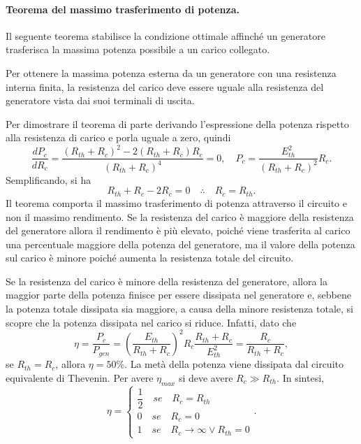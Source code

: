\paragraph{Teorema del massimo trasferimento di potenza.} Il seguente teorema stabilisce la condizione ottimale affinché un generatore trasferisca la massima potenza possibile a un carico collegato.
\begin{teo}
    Per ottenere la massima potenza esterna da un generatore con una resistenza interna finita, la resistenza del carico deve essere uguale alla resistenza del generatore vista dai suoi terminali di uscita.
\end{teo}
Per dimostrare il teorema di parte derivando l'espressione della potenza rispetto alla resistenza di carico e porla uguale a zero, quindi
\begin{equation}
    \frac{dP_c}{dR_c}=\frac{(R_{th}+R_c)^2 -2(R_{th}+R_c)R_c}{(R_{th}+R_c)^4}=0,\quad P_c=\frac{E_{th}^2}{(R_{th}+R_c)^2}R_c.
\end{equation}
Semplificando, si ha 
\begin{equation}
    R_{th}+R_c-2R_c=0\quad\therefore\quad R_c=R_{th}.
\end{equation}
Il teorema comporta il massimo trasferimento di potenza attraverso il circuito e non il massimo rendimento. Se la resistenza del carico è maggiore della resistenza del generatore allora il rendimento è più elevato, poiché viene trasferita al carico una percentuale maggiore della potenza del generatore, ma il valore della potenza sul carico è minore poiché aumenta la resistenza totale del circuito. 
    
Se la resistenza del carico è minore della resistenza del generatore, allora la maggior parte della potenza finisce per essere dissipata nel generatore e, sebbene la potenza totale dissipata sia maggiore, a causa della minore resistenza totale, si scopre che la potenza dissipata nel carico si riduce. Infatti, dato che
\begin{equation}
    \eta=\frac{P_c}{P_{gen}}=\left(\frac{E_{th}}{R_{th}+R_c}\right)^2R_c\frac{R_{th}+R_c}{E_{th}^2}=\frac{R_c}{R_{th}+R_c},
\end{equation}
se $R_{th}=R_c$, allora $\eta=50\%$. La metà della potenza viene dissipata dal circuito equivalente di Thevenin. Per avere $\eta_{max}$ si deve avere $R_c\gg R_{th}$. In sintesi,
\begin{equation}
\eta=
    \begin{cases}
        \dfrac{1}{2}\quad se\quad R_c=R_{th} \\
        0\quad se\quad R_c=0 \\
        1\quad se\quad R_c\to\infty \vee R_{th}=0
    \end{cases}.
\end{equation}

